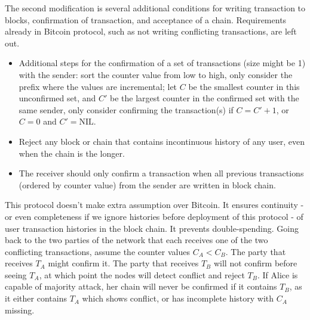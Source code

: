 \documentclass[10pt]{article}
\begin{document}
The second modification is several additional conditions for writing transaction
to blocks, confirmation of transaction, and acceptance of a chain. Requirements
already in Bitcoin protocol, such as not writing conflicting transactions, are
left out.

\begin{itemize}
    \item Additional steps for the confirmation of a set of transactions (size
    might be 1) with the sender: sort the counter value from low to high, only
    consider the prefix where the values are incremental; let $C$ be the
    smallest counter in this unconfirmed set, and $C'$ be the largest counter in
    the confirmed set with the same sender, only consider confirming the
    transaction(s) if $C = C' + 1$, or $C=0$ and $C'=\text{NIL}$.
    \item Reject any block or chain that contains incontinuous history of any
    user, even when the chain is the longer.
    \item The receiver should only confirm a transaction when all previous
    transactions (ordered by counter value) from the sender are written in block
    chain.
\end{itemize}

This protocol doesn't make extra assumption over Bitcoin. It ensures continuity
- or even completeness if we ignore histories before deployment of this
protocol - of user transaction histories in the block chain. It prevents
double-spending. Going back to the two parties of the network that each receives
one of the two conflicting transactions, assume the counter values $C_A < C_B$.
The party that receives $T_A$ might confirm it. The party that receives
$T_B$ will not confirm before seeing $T_A$, at which point the nodes will detect
conflict and reject $T_B$. If Alice is capable of majority attack, her chain
will never be confirmed if it contains $T_B$, as it either contains $T_A$ which
shows conflict, or has incomplete history with $C_A$ missing.
\end{document}
